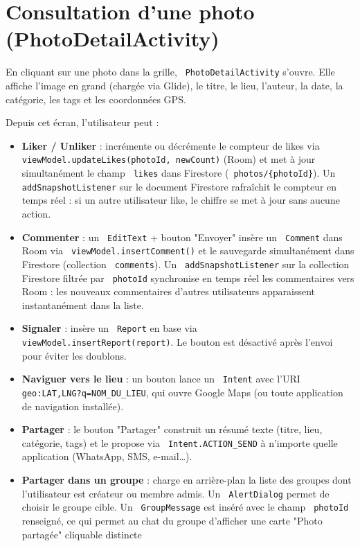 \documentclass[a4paper,12pt,openany]{report}
\newcommand{\ic}[1]{\texttt{\small\colorbox{lightbg}{\color{navy!90} #1}}}
\begin{document}
\section{Consultation d'une photo (PhotoDetailActivity)}

En cliquant sur une photo dans la grille, \ic{PhotoDetailActivity} s'ouvre.
Elle affiche l'image en grand (chargée via Glide), le titre, le lieu, l'auteur,
la date, la catégorie, les tags et les coordonnées GPS.

Depuis cet écran, l'utilisateur peut :
\begin{itemize}
  \item \textbf{Liker / Unliker} : incrémente ou décrémente le compteur de likes
    via \ic{viewModel.updateLikes(photoId, newCount)} (Room) et met à jour
    simultanément le champ \ic{likes} dans Firestore (\ic{photos/\{photoId\}}).
    Un \ic{addSnapshotListener} sur le document Firestore rafraîchit le compteur
    en temps réel : si un autre utilisateur like, le chiffre se met à jour sans
    aucune action.
  \item \textbf{Commenter} : un \ic{EditText} + bouton "Envoyer" insère un
    \ic{Comment} dans Room via \ic{viewModel.insertComment()} et le sauvegarde
    simultanément dans Firestore (collection \ic{comments}). Un
    \ic{addSnapshotListener} sur la collection Firestore filtrée par \ic{photoId}
    synchronise en temps réel les commentaires vers Room : les nouveaux commentaires
    d'autres utilisateurs apparaissent instantanément dans la liste.
  \item \textbf{Signaler} : insère un \ic{Report} en base via
    \ic{viewModel.insertReport(report)}. Le bouton est désactivé après
    l'envoi pour éviter les doublons.
  \item \textbf{Naviguer vers le lieu} : un bouton lance un \ic{Intent} avec
    l'URI \ic{geo:LAT,LNG?q=NOM\_DU\_LIEU}, qui ouvre Google Maps (ou toute
    application de navigation installée).
  \item \textbf{Partager} : le bouton "Partager" construit un résumé texte
    (titre, lieu, catégorie, tags) et le propose via \ic{Intent.ACTION\_SEND}
    à n'importe quelle application (WhatsApp, SMS, e-mail…).
  \item \textbf{Partager dans un groupe} : charge en arrière-plan la liste des
    groupes dont l'utilisateur est créateur ou membre admis. Un
    \ic{AlertDialog} permet de choisir le groupe cible. Un \ic{GroupMessage}
    est inséré avec le champ \ic{photoId} renseigné, ce qui permet au chat
    du groupe d'afficher une carte "Photo partagée" cliquable distincte

\end{itemize}
\end{document}

